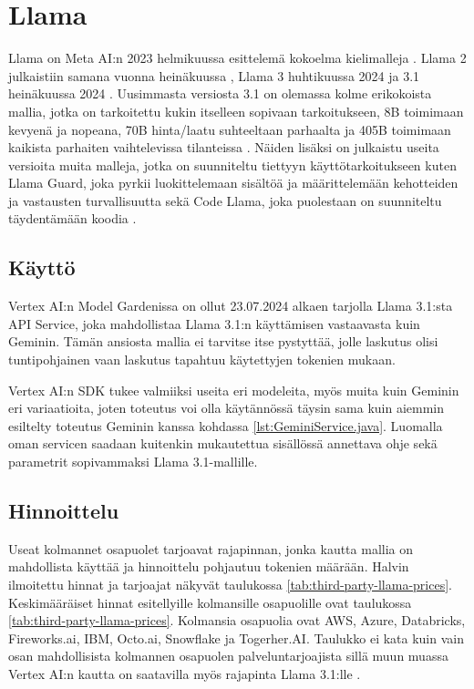 \section{Llama}

Llama on Meta AI:n 2023 helmikuussa esittelemä kokoelma kielimalleja
\parencite{llama1}. Llama 2 julkaistiin samana vuonna heinäkuussa
\parencite{llama2}, Llama 3 huhtikuussa 2024 \parencite{llama3} ja 3.1
heinäkuussa 2024 \parencite{llama31}. Uusimmasta versiosta 3.1 on olemassa
kolme erikokoista mallia, jotka on tarkoitettu kukin itselleen sopivaan
tarkoitukseen, 8B toimimaan kevyenä ja nopeana, 70B hinta/laatu suhteeltaan
parhaalta ja 405B toimimaan kaikista parhaiten vaihtelevissa tilanteissa
\parencite{llama}. Näiden lisäksi on julkaistu useita versioita muita malleja,
jotka on suunniteltu tiettyyn käyttötarkoitukseen kuten Llama Guard, joka
pyrkii luokittelemaan sisältöä ja määrittelemään kehotteiden ja vastausten
turvallisuutta \parencite{llamaGuard3} sekä Code Llama, joka puolestaan on
suunniteltu täydentämään koodia \parencite{llamaOtherModels}.

\subsection{Käyttö}

Vertex AI:n Model Gardenissa on ollut 23.07.2024 alkaen tarjolla Llama 3.1:sta
API Service, joka mahdollistaa Llama 3.1:n käyttämisen vastaavasta kuin
Geminin. Tämän ansiosta mallia ei tarvitse itse pystyttää, jolle laskutus olisi
tuntipohjainen vaan laskutus tapahtuu käytettyjen tokenien mukaan.
\parencite{vertexAiModelGardenLlama3}

Vertex AI:n SDK tukee valmiiksi useita eri modeleita, myös muita kuin Geminin
eri variaatioita, joten toteutus voi olla käytännössä täysin sama kuin aiemmin
esiltelty toteutus Geminin kanssa kohdassa \ref{lst:GeminiService.java}.
Luomalla oman servicen saadaan kuitenkin mukautettua sisällössä annettava ohje
sekä parametrit sopivammaksi Llama 3.1-mallille.

\subsection{Hinnoittelu}

Useat kolmannet osapuolet tarjoavat rajapinnan, jonka kautta mallia on
mahdollista käyttää ja hinnoittelu pohjautuu tokenien määrään. Halvin
ilmoitettu hinnat ja tarjoajat näkyvät taulukossa
\ref{tab:third-party-llama-prices}. Keskimääräiset hinnat esitellyille
kolmansille osapuolille ovat taulukossa \ref{tab:third-party-llama-prices}.
Kolmansia osapuolia ovat AWS, Azure, Databricks, Fireworks.ai, IBM, Octo.ai,
Snowflake ja Togerher.AI. \parencite{llama} Taulukko ei kata kuin vain osan
mahdollisista kolmannen osapuolen palveluntarjoajista sillä muun muassa
Vertex AI:n kautta on saatavilla myös rajapinta Llama 3.1:lle
\parencite{vertexAiModelGardenLlama3}.


